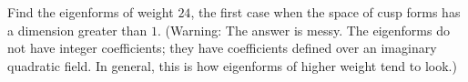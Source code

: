 \documentclass[11pt, oneside,margin=1in]{article}
\begin{document}
\begin{exercise}\label{}\text{}
Find the eigenforms of weight $24$, the first case when the space of cusp forms has a dimension greater than $1$. (Warning: The answer is messy. The eigenforms do not have integer coefficients; they have coefficients defined over an imaginary quadratic field. In general, this is how eigenforms of higher weight tend to look.)
\end{exercise}

\printindex
\end{document}
